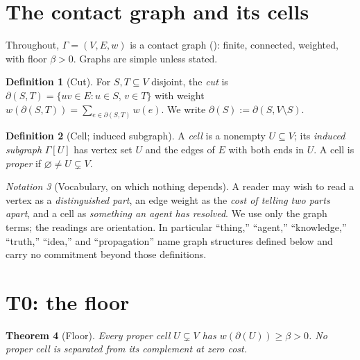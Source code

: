 \documentclass[11pt,a4paper]{article}
\theoremstyle{thmstyle}
\newtheorem{theorem}{Theorem}[section]
\theoremstyle{definition}
\newtheorem{definition}[theorem]{Definition}
\theoremstyle{remark}
\newtheorem{notation}[theorem]{Notation}
\newcommand{\Gph}{\Gamma}
\newcommand{\V}{V}
\newcommand{\E}{E}
\newcommand{\wt}{w}
\newcommand{\floorc}{\beta}
\newcommand{\cut}{\partial}
\begin{document}
\section{The contact graph and its cells}
\label{sec:setting}

Throughout, $\Gph=(\V,\E,\wt)$ is a contact graph (): finite,
connected, weighted, with floor $\floorc>0$. Graphs are simple unless
stated.

\begin{definition}[Cut]
\label{def:cut}
For $S,T\subseteq\V$ disjoint, the \emph{cut} is
$\cut(S,T)=\{uv\in\E:u\in S,\,v\in T\}$ with weight
$\wt(\cut(S,T))=\sum_{e\in\cut(S,T)}\wt(e)$. We write $\cut(S):=\cut(S,\V\setminus S)$.
\end{definition}

\begin{definition}[Cell; induced subgraph]
\label{def:cell}
A \emph{cell} is a nonempty $U\subseteq\V$; its \emph{induced subgraph}
$\Gph[U]$ has vertex set $U$ and the edges of $\E$ with both ends in $U$. A
cell is \emph{proper} if $\varnothing\neq U\subsetneq\V$.
\end{definition}

\begin{notation}[Vocabulary, on which nothing depends]
\label{not:vocab}
A reader may wish to read a vertex as a \emph{distinguished part}, an edge
weight as the \emph{cost of telling two parts apart}, and a cell as
\emph{something an agent has resolved}. We use only the graph terms; the
readings are orientation. In particular ``thing,'' ``agent,'' ``knowledge,''
``truth,'' ``idea,'' and ``propagation'' name graph structures defined
below and carry no commitment beyond those definitions.
\end{notation}

\section{T0: the floor}
\label{sec:floor}

\begin{theorem}[Floor]
\label{thm:floor}
Every proper cell $U\subsetneq\V$ has $\wt(\cut(U))\ge\floorc>0$. No proper
cell is separated from its complement at zero cost.
\end{theorem}
\end{document}
